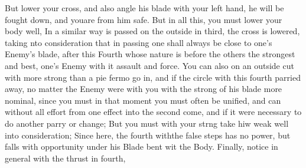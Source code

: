 \newpage


\newpage

But lower your cross, and also angle his blade with your left hand, he
will be fought down, and youare from him safe. But in all this, you
must lower your body well, 
In a similar way is passed on the outside in third, the cross is
lowered, taking nto consideration that in passing one shall always be
close to one's Enemy's blade, after this Fourth whose nature is before
the others the strongest and best, one's Enemy with it assault and force.
You can also on an outside cut with more strong than a pie fermo go
in, and if the circle with this fourth parried away, no matter the
Enemy were with you with the strong of his blade more nominal, since
you must in that moment you must often be unified, and can
without all effort from one effect into the second come, and if it
were necessary to do another parry or change;
But you must with your strng take hiw weak well into consideration;
Since here, the fourth withthe false steps has no power, but falls
with opportunity under his Blade bent wit the Body. Finally, notice
in general with  the thrust in fourth,
